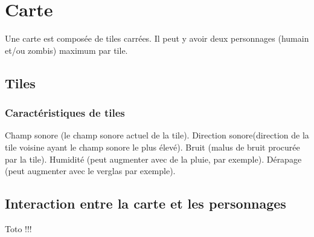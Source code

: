 \section{Carte}
Une carte est composée de tiles carrées. Il peut y avoir deux personnages (humain et/ou zombis) maximum par tile.
\subsection{Tiles}
\subsubsection{Caractéristiques de tiles}
Champ sonore (le champ sonore actuel de la tile). Direction sonore(direction de la tile voisine ayant le champ sonore le plus élevé). Bruit (malus de bruit procurée par la tile). Humidité (peut augmenter avec de la pluie, par exemple). Dérapage (peut augmenter avec le verglas par exemple). 
\subsection{Interaction entre la carte et les personnages}
Toto !!!